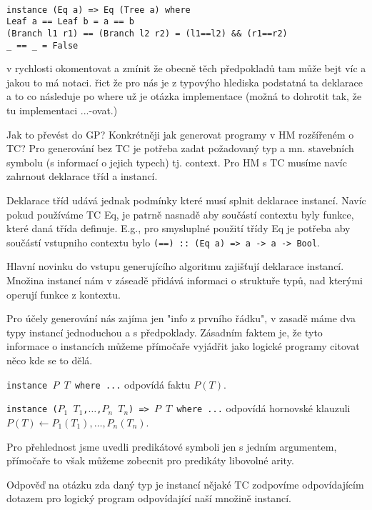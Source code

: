 \documentclass[11pt]{article}
\newcommand{\red}[1]{{\color{red} #1}}
\begin{document}
\begin{article}
\texttt{~\\
instance (Eq a) => Eq (Tree a) where\\ 
  Leaf a         == Leaf b          =  a == b\\
  (Branch l1 r1) == (Branch l2 r2)  =  (l1==l2) \&\& (r1==r2)\\
  \_              == \_               =  False\\}

\red{v rychlosti okomentovat a zmínit že obecně těch předpokladů tam může bejt víc a jakou to má notaci. řict že pro nás je z typovýho hlediska podstatná ta deklarace a to co následuje po where už je otázka implementace (možná to dohrotit tak, že tu implementaci ...-ovat.) }

Jak to převést do GP? Konkrétněji jak generovat programy v HM rozšířeném o TC?
Pro generování bez TC je potřeba zadat požadovaný typ a mn. stavebních symbolu (s informací o jejich typech) tj. context. Pro HM s TC musíme navíc zahrnout deklarace tříd a instancí.

Deklarace tříd udává jednak podmínky které musí splnit deklarace instancí. Navíc pokud používáme TC Eq, je patrně nasnadě aby součástí contextu byly funkce, které daná třída definuje. E.g., pro smysluplné použití třídy Eq je potřeba aby součástí vstupniho contextu bylo \texttt{(==) :: (Eq a) => a -> a -> Bool}. 

Hlavní novinku do vstupu generujícího algoritmu zajišťují deklarace instancí.  
Množina instancí nám  v záseadě přidává informaci o struktuře typů, nad kterými operují funkce z kontextu.

Pro účely generování nás zajíma jen "info z prvního řádku", v zasadě máme dva typy instancí jednoduchou a s předpoklady. Zásadním faktem je, že tyto informace o instancích můžeme přímočaře vyjádřit jako logické programy \red{citovat něco kde se to dělá}. 

\texttt{instance $P$ $T$ where ...} odpovídá faktu $P(T)$.

\texttt{instance ($P_1$ $T_1$,$\dots$,$P_n$ $T_n$) => $P$ $T$ where ...} odpovídá hornovské klauzuli $P(T) \leftarrow P_1(T_1),\dots,P_n(T_n)$.

Pro přehlednost jsme uvedli predikátové symboli jen s jedním argumentem, přímočaře to však můžeme zobecnit pro predikáty libovolné arity.

Odpověď na otázku zda daný typ je instancí nějaké TC zodpovíme odpovídajícím dotazem pro logický program odpovídající naší množině instancí.



\end{article}
\end{document}
